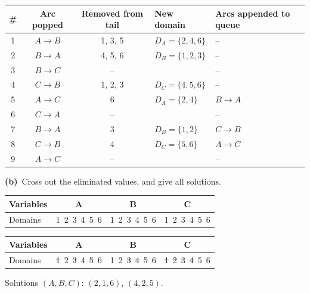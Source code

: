 \documentclass[11pt,a4paper]{article}
\newcommand{\subq}[1]{\par\smallskip\noindent\textbf{#1}\ }
\begin{document}
\begin{solbox}
\begin{center}\small\begin{tabular}{c c c l p{5cm}}\toprule
\# & Arc popped & Removed from tail & New domain & Arcs appended to queue \\ \midrule
1 & $A \to B$ & 1, 3, 5 & $D_{A}=\{2,4,6\}$ & -- \\
2 & $B \to A$ & 4, 5, 6 & $D_{B}=\{1,2,3\}$ & -- \\
3 & $B \to C$ & -- &  & -- \\
4 & $C \to B$ & 1, 2, 3 & $D_{C}=\{4,5,6\}$ & -- \\
5 & $A \to C$ & 6 & $D_{A}=\{2,4\}$ & $B\to A$ \\
6 & $C \to A$ & -- &  & -- \\
7 & $B \to A$ & 3 & $D_{B}=\{1,2\}$ & $C\to B$ \\
8 & $C \to B$ & 4 & $D_{C}=\{5,6\}$ & $A\to C$ \\
9 & $A \to C$ & -- &  & -- \\
\bottomrule\end{tabular}\end{center}
\end{solbox}
\subq{(b)}Cross out the eliminated values, and give all solutions.\begin{center}\small\begin{tabular}{|l|c|c|c|}\hline Variables & \textbf{A} & \textbf{B} & \textbf{C}\\ \hline Domains & 1\ 2\ 3\ 4\ 5\ 6 & 1\ 2\ 3\ 4\ 5\ 6 & 1\ 2\ 3\ 4\ 5\ 6\\ \hline\end{tabular}\end{center}
\begin{solbox}
\begin{center}\small\begin{tabular}{|l|c|c|c|}\hline Variables & \textbf{A} & \textbf{B} & \textbf{C}\\ \hline Domains & \textcolor{red!70!black}{\sout{1}}\ 2\ \textcolor{red!70!black}{\sout{3}}\ 4\ \textcolor{red!70!black}{\sout{5}}\ \textcolor{red!70!black}{\sout{6}} & 1\ 2\ \textcolor{red!70!black}{\sout{3}}\ \textcolor{red!70!black}{\sout{4}}\ \textcolor{red!70!black}{\sout{5}}\ \textcolor{red!70!black}{\sout{6}} & \textcolor{red!70!black}{\sout{1}}\ \textcolor{red!70!black}{\sout{2}}\ \textcolor{red!70!black}{\sout{3}}\ \textcolor{red!70!black}{\sout{4}}\ 5\ 6\\ \hline\end{tabular}\end{center}Solutions $(A,B,C)$: $(2,1,6)$, $(4,2,5)$.
\end{solbox}
\end{document}
